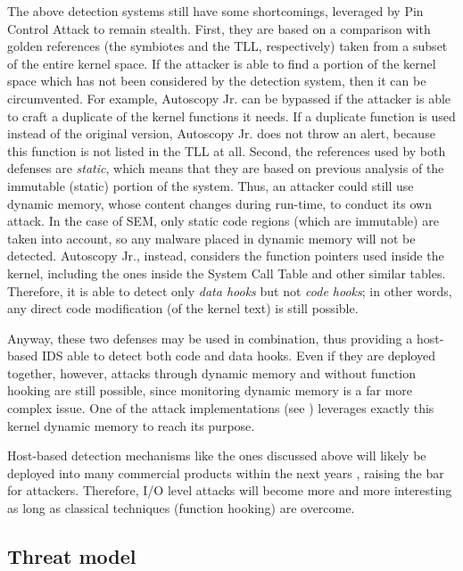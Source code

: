 The above detection systems still have some shortcomings, leveraged by Pin Control Attack to remain stealth.
First, they are based on a comparison with golden references (the symbiotes and the TLL, respectively) taken from a subset of the entire kernel space.
If the attacker is able to find a portion of the kernel space which has not been considered by the detection system, then it can be circumvented.
For example, Autoscopy Jr. can be bypassed if the attacker is able to craft a duplicate of the kernel functions it needs.
If a duplicate function is used instead of the original version, Autoscopy Jr. does not throw an alert, because this function is not listed in the TLL at all.
Second, the references used by both defenses are \emph{static}, which means that they are based on previous analysis of the immutable (static) portion of the system.
Thus, an attacker could still use dynamic memory, whose content changes during run-time, to conduct its own attack.
In the case of SEM, only static code regions (which are immutable) are taken into account, so any malware placed in dynamic memory will not be detected.
Autoscopy Jr., instead, considers the function pointers used inside the kernel, including the ones inside the System Call Table and other similar tables.
Therefore, it is able to detect only \emph{data hooks} but not \emph{code hooks}; in other words, any direct code modification (\eg of the kernel text) is still possible.

Anyway, these two defenses may be used in combination, thus providing a host-based IDS able to detect both code and data hooks.
Even if they are deployed together, however, attacks through dynamic memory and without function hooking are still possible,
since monitoring dynamic memory is a far more complex issue. One of the attack implementations (see )
leverages exactly this kernel dynamic memory to reach its purpose.

Host-based detection mechanisms like the ones discussed above will likely be deployed into many commercial products within the next years \cite{symbiote-web, autoscopy-web},
raising the bar for attackers. Therefore, I/O level attacks will become more and more interesting as long as classical techniques (\eg function hooking) are overcome.


\subsection{Threat model}
\label{sec:threat-model}

